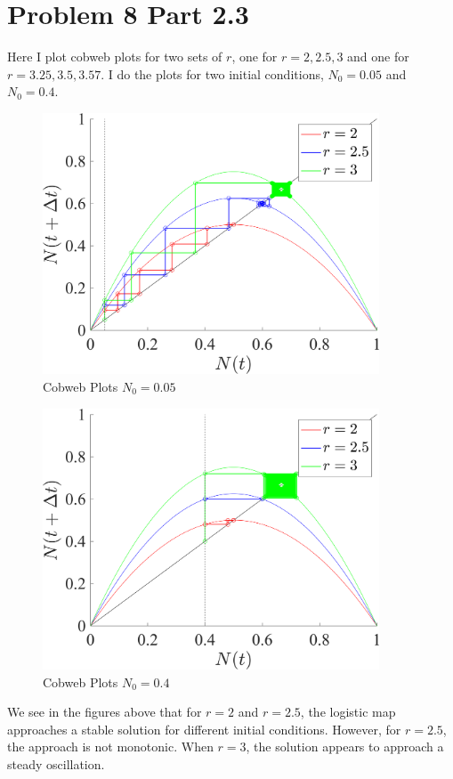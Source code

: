 \documentclass[11pt]{article}
\begin{document}
\section*{Problem 8 Part 2.3}
Here I plot cobweb plots for two sets of $r$, one for $ r = 2, 2.5, 3$ and one for $r = 3.25, 3.5, 3.57$. I do the plots for two initial conditions, $N_0 = 0.05$ and $N_0 = 0.4$.
\begin{figure}[h]
\centering
\includegraphics[width=10cm]{8_p2_3_1_r0_05}
\caption{Cobweb Plots $N_0 = 0.05$}
\end{figure}

\begin{figure}[H]
\centering
\includegraphics[width=10cm]{8_p2_3_1_r0_4}
\caption{Cobweb Plots $N_0 = 0.4$}
\end{figure}


We see in the figures above that for $r = 2$ and $r = 2.5$, the logistic map approaches a stable solution for different initial conditions. However, for $r = 2.5$, the approach is not monotonic. When $r = 3$, the solution appears to approach a steady oscillation.
\end{document}

